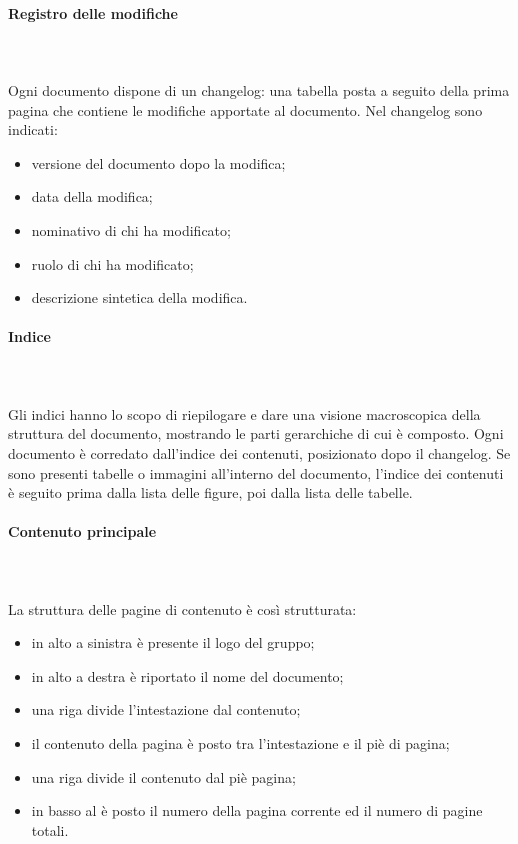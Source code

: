 		\paragraph{Registro delle modifiche} \mbox{}\\ \mbox{}\\
		Ogni documento dispone di un changelog\glo: una tabella posta a seguito della prima pagina che contiene le modifiche apportate al documento. Nel changelog sono indicati:
		\begin{itemize}
			\item versione del documento dopo la modifica;
			\item data della modifica;
			\item nominativo di chi ha modificato;
			\item ruolo di chi ha modificato;
			\item descrizione sintetica della modifica.
		\end{itemize}
		\paragraph{Indice} \mbox{}\\ \mbox{}\\
		Gli indici hanno lo scopo di riepilogare e dare una visione macroscopica della struttura del documento, mostrando le parti gerarchiche di cui è composto.\newline 
		Ogni documento è corredato dall'indice dei contenuti, posizionato dopo il changelog\glo. Se sono presenti tabelle o immagini all'interno del documento, l'indice dei contenuti è seguito prima dalla lista delle figure, poi dalla lista delle tabelle.
		\paragraph{Contenuto principale} \mbox{}\\ \mbox{}\\
		La struttura delle pagine di contenuto è così strutturata:
		\begin{itemize}
			\item in alto a sinistra è presente il logo del gruppo;
			\item in alto a destra è riportato il nome del documento;
			\item una riga divide l'intestazione dal contenuto;
			\item il contenuto della pagina è posto tra l'intestazione e il piè di pagina;
			\item una riga divide il contenuto dal piè pagina;
			\item in basso al è posto il numero della pagina corrente ed il numero di pagine totali.
		\end{itemize}

